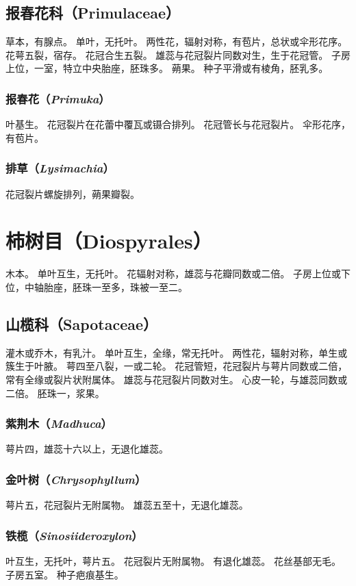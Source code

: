 \documentclass[11pt]{article}
\begin{document}
\begin{sloppypar}
\subsection{报春花科（Primulaceae）}
草本，有腺点。
单叶，无托叶。
两性花，辐射对称，有苞片，总状或伞形花序。
花萼五裂，宿存。
花冠合生五裂。
雄蕊与花冠裂片同数对生，生于花冠管。
子房上位，一室，特立中央胎座，胚珠多。
蒴果。
种子平滑或有棱角，胚乳多。

\subsubsection{报春花（\textit{Primuka}）}
叶基生。
花冠裂片在花蕾中覆瓦或镊合排列。
花冠管长与花冠裂片。
伞形花序，有苞片。

\subsubsection{排草（\textit{Lysimachia}）}
花冠裂片螺旋排列，蒴果瓣裂。

\section{柿树目（Diospyrales）}
木本。
单叶互生，无托叶。
花辐射对称，雄蕊与花瓣同数或二倍。
子房上位或下位，中轴胎座，胚珠一至多，珠被一至二。

\subsection{山榄科（Sapotaceae）}
灌木或乔木，有乳汁。
单叶互生，全缘，常无托叶。
两性花，辐射对称，单生或簇生于叶腋。
萼四至八裂，一或二轮。
花冠管短，花冠裂片与萼片同数或二倍，常有全缘或裂片状附属体。
雄蕊与花冠裂片同数对生。
心皮一轮，与雄蕊同数或二倍。
胚珠一，浆果。

\subsubsection{紫荆木（\textit{Madhuca}）}
萼片四，雄蕊十六以上，无退化雄蕊。

\subsubsection{金叶树（\textit{Chrysophyllum}）}
萼片五，花冠裂片无附属物。
雄蕊五至十，无退化雄蕊。

\subsubsection{铁榄（\textit{Sinosiideroxylon}）}
叶互生，无托叶，萼片五。
花冠裂片无附属物。
有退化雄蕊。
花丝基部无毛。
子房五室。
种子疤痕基生。


\end{sloppypar}
\end{document}
